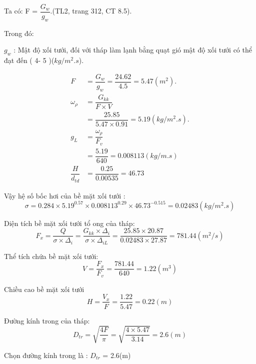 Ta có: F = $\dfrac{G_{w}}{g_{w}}$.(TL2, trang 312, CT 8.5).

Trong đó:

$g_{w}$ : Mật độ xối tưới, đối với tháp làm lạnh bằng quạt gió mật độ xối tưới có thể đạt đến ( 4- 5 )($kg/m^2.s$).

\begin{equation*}
	\begin{split}
		F& = \dfrac{G_{w}}{g_{w}}= \dfrac{24.62}{4.5} = 5.47(m^2).\\
		\omega_{\rho}& = \dfrac{G_{kk}}{F \times V}\\ 
		             & = \dfrac{25.85}{5.47 \times 0.91} = 5.19(kg/m^2.s).\\
		g_{L}& = \dfrac{\omega_{\rho}}{F_{v}}\\
		     & = \dfrac{5.19}{640}=0.008113(kg/m.s) \\ 
		\dfrac{H}{d_{td}} &= \dfrac{0.25}{0.00535}= 46.73             
	\end{split}
\end{equation*}

Vậy hệ số bốc hơi của bề mặt xối tưới :
\begin{equation*}
	\sigma = 0.284 \times 5.19^{0.57} \times 0.008113^{0.29} \times 46.73^{-0.515} = 0.02483 (kg/m^2.s)
\end{equation*}

Diện tích bề mặt xối tưới tổ ong của tháp:
\begin{equation*}
	F_{x} = \dfrac{Q}{\sigma \times \Delta_{i}} =\dfrac{G_{kk} \times \Delta_{i}}{\sigma \times \Delta_{iL}} = \dfrac{25.85 \times 20.87}{0.02483 \times 27.87} = 781.44(m^2/s)
\end{equation*}

Thể tích chứa bề mặt xối tưới:
\begin{equation*}
	V = \dfrac{F_{x}}{F_{v}} = \dfrac{781.44}{640} = 1.22(m^3)
\end{equation*}

Chiều cao bề mặt xối tưới
\begin{equation*}
	H = \dfrac{V_{x}}{F}=\dfrac{1.22}{5.47} =0.22(m)
\end{equation*}

Đường kính trong của tháp:
\begin{equation*}
	D_{tr} = \sqrt{\dfrac{4F}{\pi}} = \sqrt{\dfrac{4 \times 5.47}{3.14}} =2.6(m)
\end{equation*}

Chọn đường kính trong là : $D_{tr}$ = 2.6(m)

